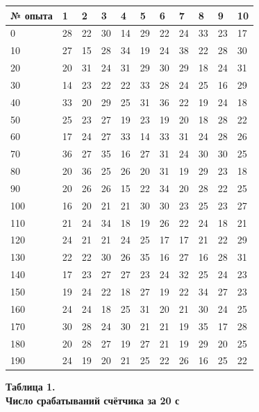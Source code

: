 \begin{table}[H]
\centering
\begin{tabular}{|l|l|l|l|l|l|l|l|l|l|l|}
\hline
№ опыта & 1  & 2  & 3  & 4  & 5  & 6  & 7  & 8  & 9  & 10 \\ \hline
0       & 28 & 22 & 30 & 14 & 29 & 22 & 24 & 33 & 23 & 17 \\ \hline
10      & 27 & 15 & 28 & 34 & 19 & 24 & 38 & 22 & 28 & 30 \\ \hline
20      & 20 & 31 & 24 & 31 & 29 & 30 & 29 & 18 & 24 & 31 \\ \hline
30      & 14 & 23 & 22 & 22 & 33 & 28 & 24 & 25 & 16 & 29 \\ \hline
40      & 33 & 20 & 29 & 25 & 31 & 36 & 22 & 19 & 24 & 18 \\ \hline
50      & 25 & 23 & 27 & 19 & 23 & 19 & 20 & 18 & 28 & 22 \\ \hline
60      & 17 & 24 & 27 & 33 & 14 & 33 & 31 & 24 & 28 & 26 \\ \hline
70      & 36 & 27 & 35 & 16 & 27 & 31 & 24 & 30 & 30 & 25 \\ \hline
80      & 20 & 36 & 25 & 26 & 20 & 31 & 19 & 29 & 23 & 18 \\ \hline
90      & 20 & 26 & 26 & 15 & 22 & 34 & 20 & 28 & 22 & 25 \\ \hline
100     & 16 & 20 & 21 & 21 & 30 & 30 & 23 & 25 & 23 & 27 \\ \hline
110     & 21 & 24 & 34 & 18 & 19 & 26 & 22 & 24 & 18 & 21 \\ \hline
120     & 24 & 21 & 21 & 24 & 25 & 17 & 17 & 21 & 22 & 29 \\ \hline
130     & 22 & 22 & 30 & 26 & 35 & 16 & 27 & 16 & 28 & 31 \\ \hline
140     & 17 & 23 & 27 & 27 & 23 & 24 & 32 & 25 & 24 & 23 \\ \hline
150     & 19 & 24 & 22 & 18 & 27 & 19 & 22 & 34 & 27 & 23 \\ \hline
160     & 24 & 24 & 18 & 25 & 31 & 20 & 21 & 30 & 24 & 25 \\ \hline
170     & 30 & 28 & 24 & 30 & 21 & 21 & 19 & 35 & 17 & 28 \\ \hline
180     & 20 & 28 & 27 & 19 & 27 & 21 & 19 & 29 & 20 & 25 \\ \hline
190     & 24 & 19 & 20 & 21 & 25 & 22 & 26 & 16 & 25 & 22 \\ \hline
\end{tabular}
\begin{flushright}
{\scriptsize \textbf{Таблица 1.}\\ \textbf {Число срабатываний счётчика за 20 с}}
\end{flushright}
\end{table}


